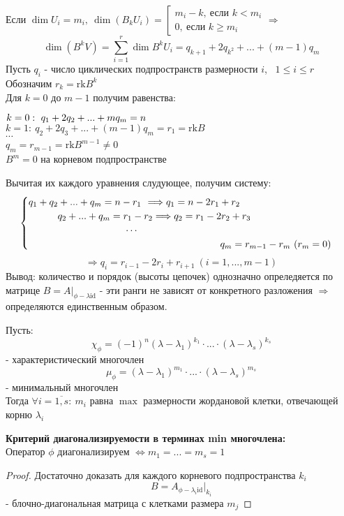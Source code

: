     Если $\dim U_i = m_i, \ \dim (B_kU_i) = \left[\begin{matrix}
        m_i - k, \ \text{если } k<m_i\\
        0, \ \text{если } k\geq m_i
    \end{matrix} \right. \Longrightarrow$
    $$\dim (B^kV) = \sum \limits_{i=1}^r \dim B^kU_i = q_{k+1}+2q_{k^2} + ... + (m-1)q_m$$ 
    Пусть $q_i$ - число циклических подпространств размерности $i$, \ $1\leq i \leq r$\\
    Обозначим $r_k = \text{rk}B^k$\\
    Для $k = 0$ до $m-1$ получим равенства: 
    \begin{center}
        $k=0: \ q_1 + 2q_2 + ... + mq_m = n\tab[2.9cm]$\\
        $k=1: \ q_2 + 2q_3 + ... + (m-1)q_m = r_1 = \text{rk}B$\\
        $\cdots$\\
        $q_m = r_{m-1} = \text{rk}B^{m-1} \neq 0$ \\
        $B^m = 0$ на корневом подпространстве     
    \end{center}
    Вычитая их каждого уравнения слудующее, получим систему:
    $$\begin{cases}
        q_1 + q_2 + ... + q_m = n - r_1 \tab[0.13cm] \Longrightarrow q_1 = n - 2r_1 + r_2 \\
        \tab[1.05cm] q_2 + ... + q_m = r_1 - r_2 \Longrightarrow q_2 = r_1 - 2r_2 + r_3\\
        \tab[3.5cm]\cdots\\
        \tab[6.9cm]q_m = r_{m-1} - r_m \ (r_m = 0)
    \end{cases}$$
    $$\Longrightarrow q_i = r_{i-1} - 2r_i + r_{i+1} \ (i = 1,...,m-1)$$
    Вывод: количество и порядок (высоты цепочек) однозначно опреледяется по матрице $B=A|_{\phi-\lambda \text{id}}$ - эти ранги не зависят от конкретного разложения $\Longrightarrow$ определяются единственным образом.
    \begin{consequense}
        Пусть: 
        $$\chi_\phi = (-1)^n(\lambda-\lambda_1)^{k_1}\cdot ... \cdot (\lambda-\lambda_s)^{k_s}$$
        - характеристический многочлен
        $$\mu_\phi = (\lambda-\lambda_1)^{m_1}\cdot ... \cdot (\lambda-\lambda_s)^{m_s}$$
        - минимальный многочлен\\
        Тогда $\forall i = \overline{1,s}: \ m_i$ равна $\max$ размерности жордановой клетки, отвечающей корню $\lambda_i$   
    \end{consequense}
    \begin{consequense}\textbf{ Критерий диагонализируемости в терминах min многочлена:} \\
        Оператор $\phi$ диагонализируем $\Longleftrightarrow m_1 = ... =m_s=1$  
    \end{consequense}
    \begin{proof}
        Достаточно доказать для каждого корневого подпространства $k_i$
        $$B = A_{\phi-\lambda_i \text{id}}|_{k_i}$$
        - блочно-диагональная матрица с клетками размера $m_j$   
    \end{proof} 

